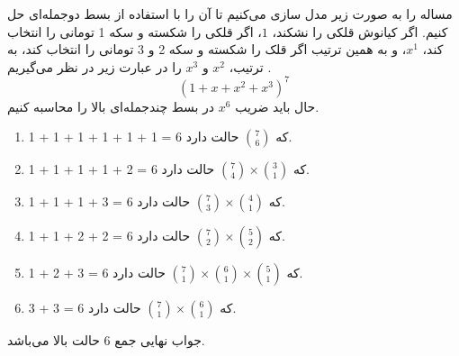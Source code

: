 \p
مساله را به صورت زیر مدل سازی می‌کنیم تا آن را با استفاده از بسط دوجمله‌ای حل کنیم.
اگر کیانوش قلکی را نشکند،
$1$،
اگر قلکی را شکسته و سکه 1 تومانی را انتخاب کند،
$x^1$،
و به همین ترتیب اگر قلک را شکسته و سکه 2 و 3 تومانی را انتخاب کند، به ترتیب،
$x^2$
و
$x^3$
را در عبارت زیر در نظر می‌گیریم
.
$$(1+x+x^2+x^3)^7$$
حال باید ضریب
$x^6$
در بسط چندجمله‌ای بالا را محاسبه کنیم.

\begin{enumerate}
    \item 
1 + 1 + 1 + 1 + 1 + 1 = 6
که 
$\binom{7}{6}$
حالت دارد.

    \item 
    1 + 1 + 1 + 1 + 2 = 6
که
$\binom{7}{4}\times\binom{3}{1}$
حالت دارد.

    \item 
    1 + 1 + 1 + 3 = 6
که
$\binom{7}{3}\times\binom{4}{1}$
حالت دارد.

    \item 
    1 + 1 + 2 + 2 = 6
که
$\binom{7}{2}\times\binom{5}{2}$
حالت دارد.

    \item 
    1 + 2 + 3 = 6
که
$\binom{7}{1}\times\binom{6}{1}\times\binom{5}{1}$
حالت دارد.

\item 
3 + 3 = 6
که
$\binom{7}{1}\times\binom{6}{1}$
حالت دارد.
\end{enumerate}

\p
جواب نهایی جمع 6 حالت بالا می‌باشد.